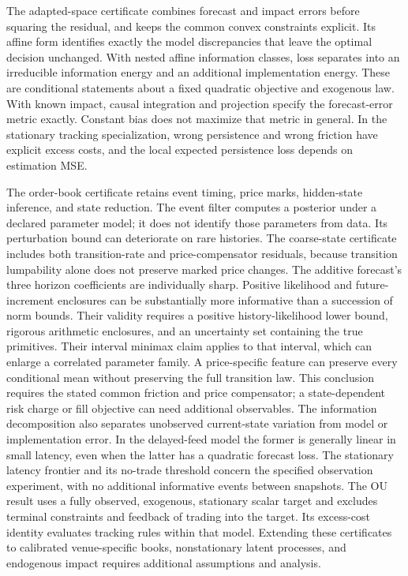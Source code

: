 \documentclass[11pt]{article}
\theoremstyle{plain}
\theoremstyle{definition}
\theoremstyle{remark}
\begin{document}
The adapted-space certificate combines forecast and impact errors
before squaring the residual, and keeps the common convex constraints
explicit. Its affine form identifies exactly the model discrepancies
that leave the optimal decision unchanged. With nested affine
information classes, loss separates into an irreducible information
energy and an additional implementation energy. These are conditional
statements about a fixed quadratic objective and exogenous law.
With known impact, causal integration and projection specify the
forecast-error metric exactly. Constant bias does not maximize that
metric in general. In the stationary tracking specialization, wrong
persistence and wrong friction have explicit excess costs, and the
local expected persistence loss depends on estimation MSE.

The order-book certificate retains event timing, price marks, hidden-state
inference, and state reduction. The event filter computes a posterior
under a declared parameter model; it does not identify those parameters
from data. Its perturbation bound can deteriorate on rare histories.
The coarse-state certificate includes both transition-rate and
price-compensator residuals, because transition lumpability alone
does not preserve marked price changes. The additive forecast's
three horizon coefficients are individually sharp. Positive
likelihood and future-increment enclosures can be substantially
more informative than a succession of norm bounds. Their validity
requires a positive history-likelihood lower bound, rigorous
arithmetic enclosures, and an uncertainty set containing the true
primitives. Their interval minimax claim applies to that interval,
which can enlarge a correlated parameter family.
A price-specific feature can preserve every conditional mean
without preserving the full transition law. This conclusion
requires the stated common friction and price compensator; a
state-dependent risk charge or fill objective can need additional
observables. The information decomposition also separates
unobserved current-state variation from model or implementation
error. In the delayed-feed model the former is generally linear
in small latency, even when the latter has a quadratic forecast
loss. The stationary latency frontier and its no-trade threshold
concern the specified observation experiment, with no additional
informative events between snapshots.
The OU result uses a fully observed, exogenous, stationary scalar target
and excludes terminal constraints and feedback of trading into the
target. Its excess-cost identity evaluates tracking rules within that
model. Extending these certificates to calibrated venue-specific books,
nonstationary latent processes, and endogenous impact requires
additional assumptions and analysis.
\end{document}
